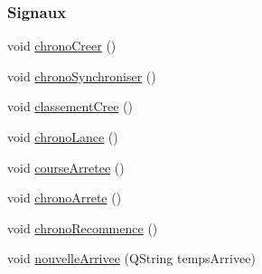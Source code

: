 \subsubsection*{Signaux}
\begin{DoxyCompactItemize}
\item 
void \hyperlink{class_chrono_a60ef5586dd429ab616c2b02c143daedf}{chrono\+Creer} ()
\item 
void \hyperlink{class_chrono_a4ae8a6eb8da3f43eb15392b08f391237}{chrono\+Synchroniser} ()
\item 
void \hyperlink{class_chrono_aea06e35eac092428e821a07a5e2df64c}{classement\+Cree} ()
\item 
void \hyperlink{class_chrono_a590290b81a290717bfe1b87f1c605181}{chrono\+Lance} ()
\item 
void \hyperlink{class_chrono_a054799dc10e42daff8545689a61aea35}{course\+Arretee} ()
\item 
void \hyperlink{class_chrono_a5e28dfd0010e34a19ccb03b9dcbe4dcd}{chrono\+Arrete} ()
\item 
void \hyperlink{class_chrono_ab697687f26503bee2b9c9e6f2a073f14}{chrono\+Recommence} ()
\item 
void \hyperlink{class_chrono_a38cf60f7ab1969d7fd1e672868156135}{nouvelle\+Arrivee} (Q\+String temps\+Arrivee)
\end{DoxyCompactItemize}
